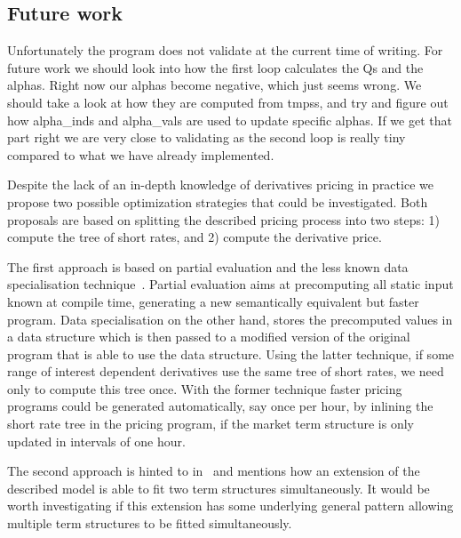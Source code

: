 \subsection{Future work}

Unfortunately the program does not validate at the current
time of writing. For future work we should look into how
the first loop calculates the Qs and the alphas.
Right now our alphas become negative, which just seems wrong.
We should take a look at how they are computed from tmpss,
and try and figure out how alpha\_inds and alpha\_vals are
used to update specific alphas. If we get that part right
we are very close to validating as the second loop is really
tiny compared to what we have already implemented.

Despite the lack of an in-depth knowledge of derivatives
pricing in practice we propose two possible optimization
strategies that could be investigated. Both proposals are
based on splitting the described pricing process into two
steps: 1) compute the tree of short rates, and 2) compute
the derivative price.

The first approach is based on partial evaluation and the
less known data specialisation
technique~\cite{malmkjaer,chirokoff}. Partial evaluation
aims at precomputing all static input known at compile time,
generating a new semantically equivalent but faster
program. Data specialisation on the other hand, stores the
precomputed values in a data structure which is then passed
to a modified version of the original program that is able
to use the data structure. Using the latter technique, if some
range of interest dependent derivatives use the same tree of
short rates, we need only to compute this tree once. With
the former technique faster pricing programs could be
generated automatically, say once per hour, by inlining the
short rate tree in the pricing program, if the market term
structure is only updated in intervals of one hour.

The second approach is hinted to in~\cite{HullWhite94} and
mentions how an extension of the described model is able to
fit two term structures simultaneously. It would be worth
investigating if this extension has some underlying general
pattern allowing multiple term structures to be fitted
simultaneously.
